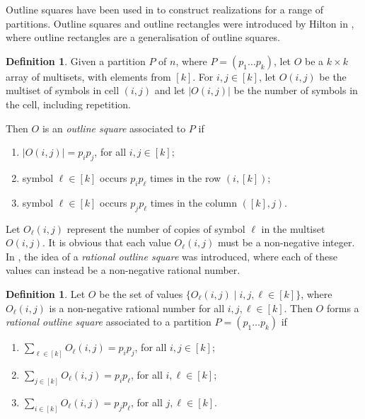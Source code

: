\documentclass[preprint,nonatbib]{elsarticle}
\theoremstyle{definition}
\newtheorem{definition}[theorem]{Definition}
\numberwithin{equation}{section}
\begin{document}
Outline squares have been used in \cite{kemp2024latin,kuhl2019existence,kuhl2018latin} to construct realizations for a range of partitions. Outline squares and outline rectangles were introduced by Hilton in \cite{hilton1980reconstruction}, where outline rectangles are a generalisation of outline squares.

\begin{definition}
    Given a partition $P$ of $n$, where $P = (p_1\dots p_k)$, let $O$ be a $k\times k$ array of multisets, with elements from $[k]$. For $i,j\in [k]$, let $O(i,j)$ be the multiset of symbols in cell $(i,j)$ and let $|O(i,j)|$ be the number of symbols in the cell, including repetition.
    
    Then $O$ is an \emph{outline square} associated to $P$ if
    \begin{enumerate}[label=\textup{(\arabic*)}]
        \item $|O(i,j)| = p_ip_j$, for all $i,j\in[k]$;
        \item symbol $\ell\in[k]$ occurs $p_ip_\ell$ times in the row $(i,[k])$;
        \item symbol $\ell\in[k]$ occurs $p_jp_\ell$ times in the column $([k],j)$.
    \end{enumerate}
\end{definition}

Let $O_\ell(i,j)$ represent the number of copies of symbol $\ell$ in the multiset $O(i,j)$. It is obvious that each value $O_\ell(i,j)$ must be a non-negative integer. In \cite{kemp2024latin}, the idea of a \emph{rational outline square} was introduced, where each of these values can instead be a non-negative rational number.

\begin{definition}
    Let $O$ be the set of values $\{O_\ell(i,j)\mid i,j,\ell\in[k]\}$, where $O_\ell(i,j)$ is a non-negative rational number for all $i,j,\ell\in[k]$. Then $O$ forms a \emph{rational outline square} associated to a partition $P = (p_1\dots p_k)$ if
    \begin{enumerate}[label=\textup{(\arabic*)}]
        \item $\sum_{\ell\in[k]} O_\ell(i,j) = p_ip_j$, for all $i,j\in[k]$;
        \item $\sum_{j\in[k]} O_\ell(i,j) = p_ip_\ell$, for all $i,\ell\in[k]$;
        \item $\sum_{i\in[k]} O_\ell(i,j) = p_jp_\ell$, for all $j,\ell\in[k]$.
    \end{enumerate}
\end{definition}
\end{document}
